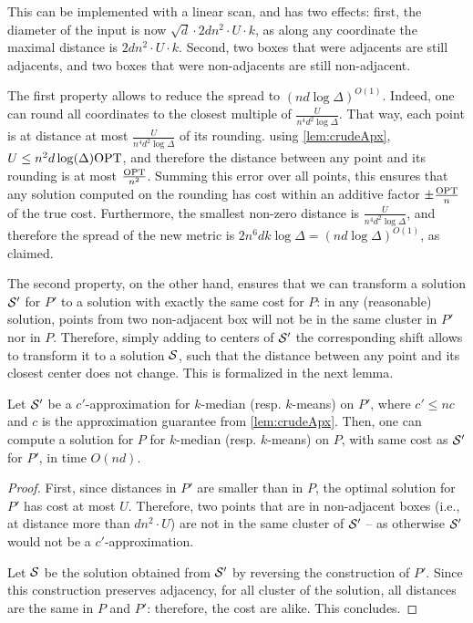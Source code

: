 This can be implemented with a linear scan, and has two effects: first, the diameter of the input is now $\sqrt{d} \cdot 2d n^2\cdot U \cdot k$, as along any coordinate the maximal distance is $2d n^2\cdot U \cdot k$. Second, two boxes that were adjacents are still adjacents, and two boxes that were non-adjacents are still non-adjacent.

The first property allows to reduce the spread to $(nd \log \Delta)^{O(1)}$. Indeed, one can round all coordinates to the closest multiple of $\frac{U}{n^4 d^{2} \log \Delta}$. That way, each point is at distance at most $\frac{U}{n^4 d^{2} \log \Delta}$ of its rounding. using \cref{lem:crudeApx}, $U \leq n^2 d \log(\Delta) \text{OPT}$, and therefore the distance between any point and its rounding is at most $\frac{\text{OPT}}{n^2}$. Summing this error over all points, this ensures that any solution computed on the rounding has cost within an additive factor $\pm \frac{\text{OPT}}{n}$ of the true cost. Furthermore, the smallest non-zero distance is $\frac{U}{n^4 d^{2} \log \Delta}$, and therefore the spread of the new metric is $2 n^6 d k \log \Delta = (nd \log \Delta)^{O(1)}$, as claimed.

The second property, on the other hand, ensures that we can transform a solution $\mathcal S'$ for $P'$ to a solution with exactly the same cost for $P$: in any (reasonable) solution, points from two non-adjacent box will not be in the same cluster in $P'$ nor in $P$. Therefore, simply adding to centers of $\mathcal S'$ the corresponding shift allows to transform it to a solution $\mathcal S$, such that the distance between any point and its closest center does not change. This is formalized in the next lemma.

\begin{lemma}
Let $\mathcal S'$ be a $c'$-approximation for  $k$-median (resp. $k$-means) on $P'$, where $c' \leq nc$ and $c$ is the approximation guarantee from \cref{lem:crudeApx}. Then, one can compute a solution for $P$ for $k$-median (resp. $k$-means) on $P$, with same cost as $\mathcal S'$ for $P'$, in time $O(nd)$.
\end{lemma}
\begin{proof}
First, since distances in $P'$ are smaller than in $P$, the optimal solution for $P'$ has cost at most $U$. Therefore, two points that are in non-adjacent boxes (i.e., at distance more than $d n^2\cdot U$) are not in the same cluster of $\mathcal S'$ -- as otherwise $\mathcal S'$ would not be a $c'$-approximation.

Let $\mathcal S$ be the solution obtained from $\mathcal S'$ by reversing the construction of $P'$. Since this construction preserves adjacency, for all cluster of the solution, all distances are the same in $P$ and $P'$: therefore, the cost are alike. This concludes.
\end{proof}


